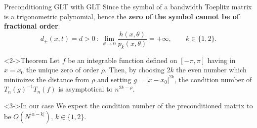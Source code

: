 \documentclass[aspectratio=169,xcolor=dvipsnames]{beamer}
\begin{document}
\begin{frame}{Preconditioning GLT with GLT}
	\alert{\faBomb} Since the symbol of a bandwidth Toeplitz
	matrix is a trigonometric polynomial, hence the \textbf{zero of the symbol cannot be of fractional order}:
	\[
	d_{\pm}(x,t) = d > 0\,:\;\lim_{\theta \rightarrow 0} \frac{h(x,\theta)}{p_k(x,\theta)} = +\infty, \qquad k \in \{1,2\}.
	\]
	
\begin{alertblock}<2->{Theorem \parencite[Theorem 3.1]{MR1480523}}
Let $f$ be an integrable function defined on $[-\pi,\pi]$ having in $x = x_0$ the unique zero of order $\rho$. Then, by choosing $2k$ the even number which minimizes the distance from $\rho$ and setting $g = |x-x_0|^{2k}$, the condition number of $T_n(g)^{-1} T_n(f)$ is asymptotical to $n^{2k-\rho}$.
\end{alertblock}

\begin{exampleblock}<3->{In our case}
We expect the condition number of the preconditioned matrix to be $O(N^{|\alpha-k|})$, $k \in \{1,2\}$.
\end{exampleblock}

\end{frame}
\end{document}
